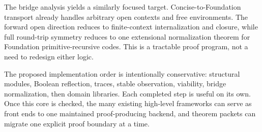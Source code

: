The bridge analysis yields a similarly focused target.  Concise-to-Foundation
transport already handles arbitrary open contexts and free environments.  The
forward open direction reduces to finite-context internalization and closure,
while full round-trip symmetry reduces to one extensional normalization
theorem for Foundation primitive-recursive codes.  This is a tractable proof
program, not a need to redesign either logic.

The proposed implementation order is intentionally conservative: structural
modules, Boolean reflection, traces, stable observation, viability, bridge
normalization, then domain libraries.  Each completed step is useful on its
own.  Once this core is checked, the many existing high-level frameworks can
serve as front ends to one maintained proof-producing backend, and theorem
packets can migrate one explicit proof boundary at a time.
